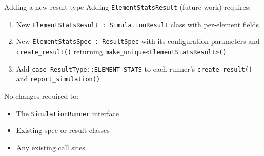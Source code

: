 \documentclass{beamer}
\begin{document}
\begin{frame}{Adding a new result type}
Adding \texttt{ElementStatsResult} (future work) requires:
\begin{enumerate}
  \item New \lstinline|ElementStatsResult : SimulationResult| class with per-element fields
  \item New \lstinline|ElementStatsSpec : ResultSpec| with its configuration parameters and \lstinline|create_result()| returning \lstinline|make_unique<ElementStatsResult>()|
  \item Add \lstinline|case ResultType::ELEMENT_STATS| to each runner's \lstinline|create_result()| and \lstinline|report_simulation()|
\end{enumerate}
\vspace{0.5em}
No changes required to:
\begin{itemize}
  \item The \texttt{SimulationRunner} interface
  \item Existing spec or result classes
  \item Any existing call sites
\end{itemize}
\end{frame}
\end{document}
